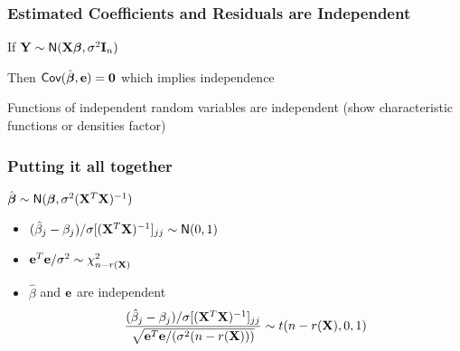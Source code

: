 \documentclass[handout]{beamer}
\begin{document}
\begin{frame}
  \frametitle{ Estimated Coefficients and Residuals are Independent}
If  $\mathbf{Y} \sim \textsf{N}(\mathbf{X}\boldsymbol{\beta}, \sigma^2 \mathbf{I}_n)$

Then $\textsf{Cov}(\hat{\boldsymbol{\beta}}, \mathbf{e}) = \mathbf{0}$ which implies independence 
\vfill

Functions of independent random variables are independent
(show characteristic functions or densities factor)
\end{frame}

\begin{frame}\frametitle{Putting it all together}
$\hat{\boldsymbol{\beta}} \sim \textsf{N}(\boldsymbol{\beta}, \sigma^2 (\mathbf{X}^T\mathbf{X})^{-1})$
  \begin{itemize}
  \item $(\hat{\beta}_j - \beta_j)/ \sigma [(\mathbf{X}^T\mathbf{X})^{-1}]_{jj} \sim
    \textsf{N}(0,1)$
\item $\mathbf{e}^T\mathbf{e}/ \sigma^2 \sim \chi^2_{n - r(\mathbf{X})}$
\item $\hat{\beta}$ and $\mathbf{e}$ are independent
$$ \frac{(\hat{\beta}_j - \beta_j)/ \sigma [(\mathbf{X}^T\mathbf{X})^{-1}]_{jj}}
{\sqrt{\mathbf{e}^T\mathbf{e}/ ( \sigma^2 (n - r(\mathbf{X})))}} \sim t(n - r(\mathbf{X}), 0, 1)$$
  \end{itemize}
\end{frame}
\end{document}
